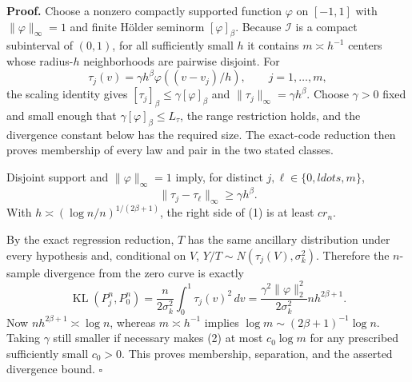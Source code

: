 \textbf{Proof.}
Choose a nonzero compactly supported function \(\varphi\) on \([-1,1]\) with \(\|\varphi\|_\infty=1\) and finite H\"older seminorm \([\varphi]_\beta\).  Because \(\mathcal I\) is a compact subinterval of \((0,1)\), for all sufficiently small \(h\) it contains \(m\asymp h^{-1}\) centers whose radius-\(h\) neighborhoods are pairwise disjoint.  For
\[
 \tau_j(v)=\gamma h^\beta\varphi((v-v_j)/h),\qquad j=1,\ldots,m,
\]
the scaling identity gives \([\tau_j]_\beta\le\gamma[\varphi]_\beta\) and \(\|\tau_j\|_\infty=\gamma h^\beta\).  Choose \(\gamma>0\) fixed and small enough that \(\gamma[\varphi]_\beta\le L_\tau\), the range restriction holds, and the divergence constant below has the required size.  The exact-code reduction then proves membership of every law and pair in the two stated classes.

Disjoint support and \(\|\varphi\|_\infty=1\) imply, for distinct \(j,\ell\in\{0,ldots,m\}\),
\[
 \|\tau_j-\tau_\ell\|_\infty\ge\gamma h^\beta. \tag{1}
\]
With \(h\asymp(\log n/n)^{1/(2\beta+1)}\), the right side of (1) is at least \(c r_n\).

By the exact regression reduction, \(T\) has the same ancillary distribution under every hypothesis and, conditional on \(V\), \(Y/T\sim N(\tau_j(V),\sigma_k^2)\).  Therefore the \(n\)-sample divergence from the zero curve is exactly
\[
 \operatorname{KL}(P_j^n,P_0^n)
 =\frac{n}{2\sigma_k^2}\int_0^1\tau_j(v)^2\,dv
 =\frac{\gamma^2\|\varphi\|_2^2}{2\sigma_k^2}nh^{2\beta+1}. \tag{2}
\]
Now \(nh^{2\beta+1}\asymp\log n\), whereas \(m\asymp h^{-1}\) implies \(\log m\sim(2\beta+1)^{-1}\log n\).  Taking \(\gamma\) still smaller if necessary makes (2) at most \(c_0\log m\) for any prescribed sufficiently small \(c_0>0\).  This proves membership, separation, and the asserted divergence bound. \(\square\)